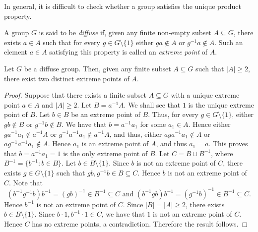 In general, it is difficult to check whether a group satisfies the unique product property. 

\begin{definition}
	A group $G$ is said to be {\em diffuse} if, given any finite non-empty subset $A\subseteq G$, 
	there exists $a\in A$ such that for every $g\in G\setminus\{ 1\}$ either 
	$ga\notin A$ or $g^{-1}a\notin A$. Such an element $a\in A$ satisfying this property 
	is called an {\em extreme point} of $A$.  
\end{definition}

\begin{proposition}
Let $G$ be a diffuse group. Then, given any finite subset $A\subseteq G$ such that $|A|\geq 2$, there exist two distinct extreme points of $A$. 
\end{proposition}

\begin{proof}
Suppose that there exists a finite subset $A\subseteq G$ with a unique extreme point $a\in A$ and $|A|\geq 2$.
Let $B=a^{-1}A$. We shall see that $1$ is the unique extreme point of $B$. Let $b\in B$ be an extreme point of $B$. Thus, for every $g\in G\setminus\{ 1\}$, either $gb\notin B$ or $g^{-1}b\notin B$. We have that $b=a^{-1}a_1$ for some $a_1\in A$. Hence either $ga^{-1}a_1\notin a^{-1}A$ or $g^{-1}a^{-1}a_1\notin a^{-1}A$, and thus, either $aga^{-1}a_1\notin A$ or $ag^{-1}a^{-1}a_1\notin A$. Hence $a_1$ is an extreme point of $A$, and thus $a_1=a$. This proves that $b=a^{-1}a_1=1$ is the only extreme point of $B$. Let $C=B\cup B^{-1}$, where $B^{-1}=\{ b^{-1} : b\in B\}$. Let $b\in B\setminus\{ 1\}$. Since $b$ is not  an extreme point of $C$, there exists $g\in G\setminus\{ 1\}$ such that $gb,g^{-1}b\in B\subseteq C$. Hence $b$ is not an extreme point of $C$. Note that
\[ (b^{-1}g^{-1}b)b^{-1}=(gb)^{-1}\in B^{-1}\subseteq C\text{ and }(b^{-1}gb)b^{-1}=(g^{-1}b)^{-1}\in B^{-1}\subseteq C.\]
Hence $b^{-1}$ is not an extreme point of $C$. Since $|B|=|A|\geq 2$, there exists $b\in B\setminus\{ 1\}$. Since $b\cdot 1,b^{-1}\cdot 1\in C$, we have that $1$ is not an extreme point of $C$. Hence $C$ has no extreme points, a contradiction. Therefore the result follows. 
\end{proof}


